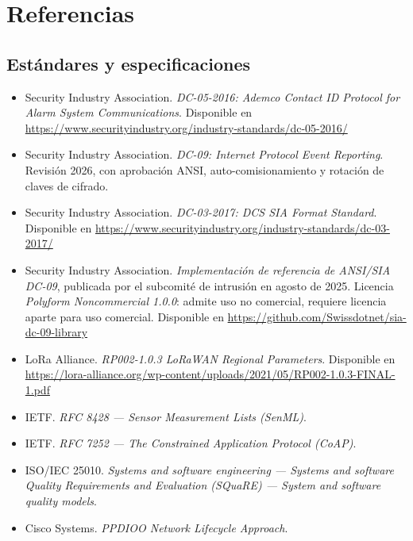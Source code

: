 \section*{Referencias}

\subsection*{Estándares y especificaciones}

\begin{itemize}[leftmargin=1.2em]
\item Security Industry Association. \emph{DC-05-2016: Ademco Contact ID Protocol for Alarm System
Communications}. Disponible en \url{https://www.securityindustry.org/industry-standards/dc-05-2016/}

\item Security Industry Association. \emph{DC-09: Internet Protocol Event Reporting}. Revisión 2026,
con aprobación ANSI, auto-comisionamiento y rotación de claves de cifrado.

\item Security Industry Association. \emph{DC-03-2017: DCS SIA Format Standard}. Disponible en
\url{https://www.securityindustry.org/industry-standards/dc-03-2017/}

\item Security Industry Association. \emph{Implementación de referencia de ANSI/SIA DC-09}, publicada
por el subcomité de intrusión en agosto de 2025. Licencia \emph{Polyform Noncommercial 1.0.0}: admite
uso no comercial, requiere licencia aparte para uso comercial. Disponible en
\url{https://github.com/Swissdotnet/sia-dc-09-library}

\item LoRa Alliance. \emph{RP002-1.0.3 LoRaWAN Regional Parameters}. Disponible en
\url{https://lora-alliance.org/wp-content/uploads/2021/05/RP002-1.0.3-FINAL-1.pdf}

\item IETF. \emph{RFC 8428 --- Sensor Measurement Lists (SenML)}.

\item IETF. \emph{RFC 7252 --- The Constrained Application Protocol (CoAP)}.

\item ISO/IEC 25010. \emph{Systems and software engineering --- Systems and software Quality
Requirements and Evaluation (SQuaRE) --- System and software quality models}.

\item Cisco Systems. \emph{PPDIOO Network Lifecycle Approach}.
\end{itemize}

